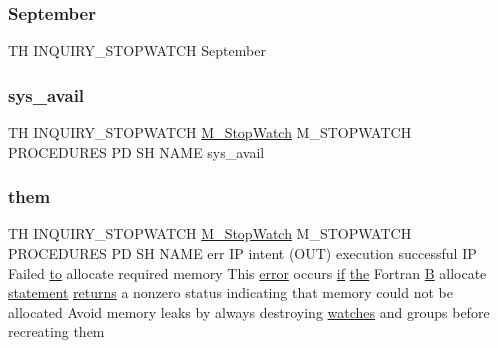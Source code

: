 \mbox{\label{inquiry__stopwatch_83_8txt_a5343cd7a514240c99a373cb1e09e1d08}} 
\subsubsection{\texorpdfstring{September}{September}}
{\footnotesize\ttfamily TH I\+N\+Q\+U\+I\+R\+Y\+\_\+\+S\+T\+O\+P\+W\+A\+T\+CH September}

\mbox{\label{inquiry__stopwatch_83_8txt_a1f4290ad6f2e60e1f902db8a5e86ba7b}} 
\subsubsection{\texorpdfstring{sys\+\_\+avail}{sys\_avail}}
{\footnotesize\ttfamily TH I\+N\+Q\+U\+I\+R\+Y\+\_\+\+S\+T\+O\+P\+W\+A\+T\+CH \hyperlink{option__stopwatch_83_8txt_aa2011fc45a5e502e87ee50996a8a9305}{M\+\_\+\+Stop\+Watch} M\+\_\+\+S\+T\+O\+P\+W\+A\+T\+CH P\+R\+O\+C\+E\+D\+U\+R\+ES PD SH N\+A\+ME sys\+\_\+avail}

\mbox{\label{inquiry__stopwatch_83_8txt_aba56042309c21e69313821cb6c092c35}} 
\subsubsection{\texorpdfstring{them}{them}}
{\footnotesize\ttfamily TH I\+N\+Q\+U\+I\+R\+Y\+\_\+\+S\+T\+O\+P\+W\+A\+T\+CH \hyperlink{option__stopwatch_83_8txt_aa2011fc45a5e502e87ee50996a8a9305}{M\+\_\+\+Stop\+Watch} M\+\_\+\+S\+T\+O\+P\+W\+A\+T\+CH P\+R\+O\+C\+E\+D\+U\+R\+ES PD SH N\+A\+ME err IP intent (O\+UT) execution successful IP Failed \hyperlink{M__stopwatch_83_8txt_a97209fd3e34ef701c0a9734280779cbb}{to} allocate required memory This \hyperlink{M__stopwatch_83_8txt_ac4611edff506351be87ddb9adfc62315}{error} occurs \hyperlink{exit_87_8txt_a77395982f8d25581c808c40f3b634d90}{if} \hyperlink{M__stopwatch_83_8txt_a0f266597de2e57eb3aa964927bb30e14}{the} Fortran \hyperlink{intro__blas1_83_8txt_a5f157716d3fd55e7b7e08312dc859b58}{B} allocate \hyperlink{M__stopwatch_83_8txt_a43758526aa61bbaa49faf1e287658350}{statement} \hyperlink{M__stopwatch_83_8txt_aee54cdd5349bf498aa96e7f9426a0717}{returns} a nonzero status indicating that memory could not be allocated Avoid memory leaks by always destroying \hyperlink{M__stopwatch_83_8txt_a21c5980264dbe8d8a18083e2dd1ffaa9}{watches} and groups before recreating them}

